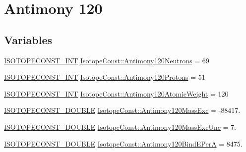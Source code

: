 \hypertarget{group___isotope_const-_antimony-_sb120}{}\section{Antimony 120}
\label{group___isotope_const-_antimony-_sb120}
\subsection*{Variables}
\begin{DoxyCompactItemize}
\item 
\mbox{\hyperlink{group___isotope_const-_macros_ga5f18360b3e99483a35c32d789e62621c}{I\+S\+O\+T\+O\+P\+E\+C\+O\+N\+S\+T\+\_\+\+I\+NT}} \mbox{\hyperlink{group___isotope_const-_antimony-_sb120_ga2a269b95aa762bdb4645e01d81562470}{Isotope\+Const\+::\+Antimony120\+Neutrons}} = 69
\item 
\mbox{\hyperlink{group___isotope_const-_macros_ga5f18360b3e99483a35c32d789e62621c}{I\+S\+O\+T\+O\+P\+E\+C\+O\+N\+S\+T\+\_\+\+I\+NT}} \mbox{\hyperlink{group___isotope_const-_antimony-_sb120_gab80ec5d7710e7b3fb6d69632f948da6b}{Isotope\+Const\+::\+Antimony120\+Protons}} = 51
\item 
\mbox{\hyperlink{group___isotope_const-_macros_ga5f18360b3e99483a35c32d789e62621c}{I\+S\+O\+T\+O\+P\+E\+C\+O\+N\+S\+T\+\_\+\+I\+NT}} \mbox{\hyperlink{group___isotope_const-_antimony-_sb120_ga4b1f601d9e9e60f6bf1fa629092cfdd6}{Isotope\+Const\+::\+Antimony120\+Atomic\+Weight}} = 120
\item 
\mbox{\hyperlink{group___isotope_const-_macros_ga8f45a7272ce02c0b4c65c44636ed719a}{I\+S\+O\+T\+O\+P\+E\+C\+O\+N\+S\+T\+\_\+\+D\+O\+U\+B\+LE}} \mbox{\hyperlink{group___isotope_const-_antimony-_sb120_ga51849284abdada7bb97c0b6f8296eb59}{Isotope\+Const\+::\+Antimony120\+Mass\+Exc}} = -\/88417.
\item 
\mbox{\hyperlink{group___isotope_const-_macros_ga8f45a7272ce02c0b4c65c44636ed719a}{I\+S\+O\+T\+O\+P\+E\+C\+O\+N\+S\+T\+\_\+\+D\+O\+U\+B\+LE}} \mbox{\hyperlink{group___isotope_const-_antimony-_sb120_ga8e4743ba410dae6839afdc1e0e1ac43e}{Isotope\+Const\+::\+Antimony120\+Mass\+Exc\+Unc}} = 7.
\item 
\mbox{\hyperlink{group___isotope_const-_macros_ga8f45a7272ce02c0b4c65c44636ed719a}{I\+S\+O\+T\+O\+P\+E\+C\+O\+N\+S\+T\+\_\+\+D\+O\+U\+B\+LE}} \mbox{\hyperlink{group___isotope_const-_antimony-_sb120_ga16569ceb52ff453275a8726c66285ce4}{Isotope\+Const\+::\+Antimony120\+Bind\+E\+PerA}} = 8475.
\item 

\end{DoxyCompactItemize}
